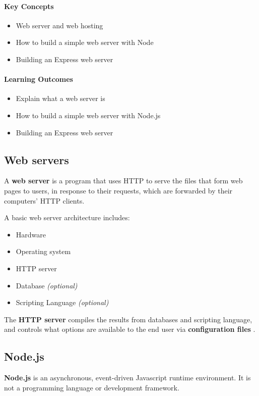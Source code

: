 \begin{mdframed}

\paragraph{Key Concepts}
\begin{itemize}[label={\checkmark}]
\item Web server and web hosting
\item How to build a simple web server with Node
\item Building an Express web server
\end{itemize}

\paragraph{Learning Outcomes}
\begin{itemize}[label={\checkmark}]
\item Explain what a web server is
\item How to build a simple web server with Node.js
\item Building an Express web server

\end{itemize}
\end{mdframed}
\subsection{Web servers}
A \textbf{web server} is a program that uses HTTP to serve the files that form web pages to users, in response to their requests, which are forwarded by their computers' HTTP clients.

A basic web server architecture includes:

\begin{itemize}
	\item Hardware
	\item Operating system
	\item HTTP server
	\item Database \emph{(optional)} 
	\item Scripting Language \emph{(optional)} 
\end{itemize}

The \textbf{HTTP server} compiles the results from databases and scripting language, and controls what options are available to the end user via \textbf{configuration files} . 

\subsection{Node.js}
\textbf{Node.js} is an asynchronous, event-driven Javascript runtime environment. It is not a programming language or development framework.

